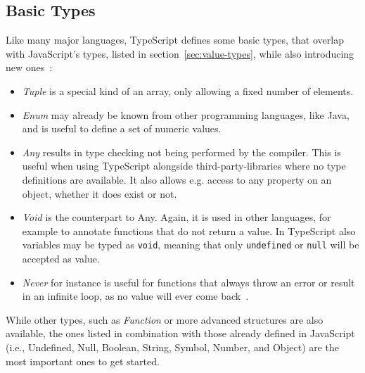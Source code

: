 \subsection{Basic Types}
\label{sec:ts-basic-types}

Like many major languages, TypeScript defines some basic types, that overlap with JavaScript's types, listed in section~\ref{sec:value-types}, while also introducing new ones~\cite{TypeScriptHandbook:BasicTypes}:
\begin{itemize}
  \item \emph{Tuple} is a special kind of an array, only allowing a fixed number of elements.
  \item \emph{Enum} may already be known from other programming languages, like Java, and is useful to define a set of numeric values.
  \item \emph{Any} results in type checking not being performed by the compiler. This is useful when using TypeScript alongside third-party-libraries where no type definitions are available. It also allows e.g. access to any property on an object, whether it does exist or not.
  \item \emph{Void} is the counterpart to Any. Again, it is used in other languages, for example to annotate functions that do not return a value. In TypeScript also variables may be typed as \texttt{void}, meaning that only \texttt{undefined} or \texttt{null} will be accepted as value.
  \item \emph{Never} for instance is useful for functions that always throw an error or result in an infinite loop, as no value will ever come back~\cite{TypeScriptHandbook:BasicTypes}.
\end{itemize}
While other types, such as \emph{Function} or more advanced structures are also available, the ones listed in combination with those already defined in JavaScript (i.e., Undefined, Null, Boolean, String, Symbol, Number, and Object) are the most important ones to get started.


